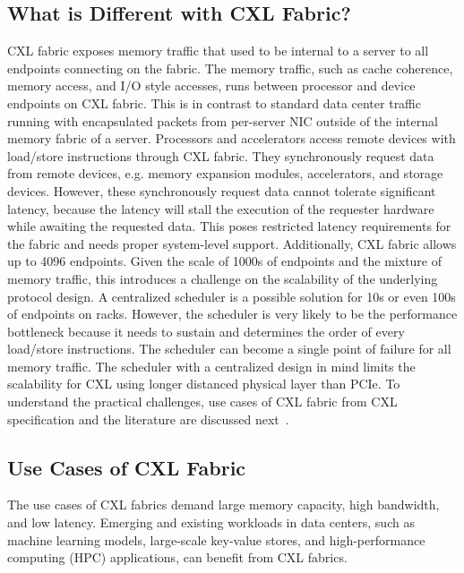 \subsection{What is Different with CXL Fabric?}
CXL fabric exposes memory traffic that used to be internal to a server to all endpoints connecting on the fabric. 
%
The memory traffic, such as cache coherence, memory access, and I/O style accesses, runs between processor and device endpoints on CXL fabric.
%
This is in contrast to standard data center traffic running with encapsulated packets from per-server NIC outside of the internal memory fabric of a server.
%
Processors and accelerators access remote devices with load/store instructions through CXL fabric.
%
They synchronously request data from remote devices, e.g. memory expansion modules, accelerators, and storage devices. 
%
However, these synchronously request data cannot tolerate significant latency, because the latency will 
stall the execution of the requester hardware while awaiting the requested data.
%
This poses restricted latency requirements for the fabric and needs proper system-level support. 
%
Additionally, CXL fabric allows up to 4096 endpoints.
%
Given the scale of 1000s of endpoints and the mixture of memory traffic,
this introduces a challenge on the scalability of the underlying protocol design.
%
A centralized scheduler is a possible solution for 10s or even 100s of endpoints on racks.
%
However, the scheduler is very likely to be the performance bottleneck because it needs to sustain and determines the order of every load/store instructions.
%
The scheduler can become a single point of failure for all memory traffic.
%
The scheduler with a centralized design in mind limits the scalability for CXL using longer distanced physical layer than PCIe.
%
To understand the practical challenges, use cases of CXL fabric from CXL specification and the literature are discussed next~\cite{cxl-3-0-spec, directcxl:atc:2022, pond:asplos:2023}. 
%

\subsection{Use Cases of CXL Fabric}
\label{aurelia:subsec:use-cases}
The use cases of CXL fabrics demand large memory capacity, high bandwidth, and low latency.
%
Emerging and existing workloads in data centers, such as machine learning models, 
large-scale key-value stores, and high-performance computing (HPC) applications, can benefit from CXL fabrics.   

